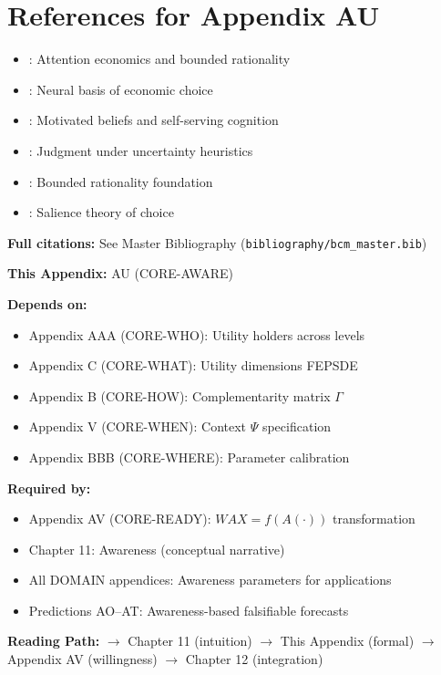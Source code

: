 \section{References for Appendix AU}
\label{sec:au-references}

\begin{itemize}[nosep]
    \item \citet{kahneman2003}: Attention economics and bounded rationality
    \item \citet{rangel2008}: Neural basis of economic choice
    \item \citet{fehrrangel2011}: Motivated beliefs and self-serving cognition
    \item \citet{tversky1974}: Judgment under uncertainty heuristics
    \item \citet{simon1955}: Bounded rationality foundation
    \item \citet{bordalo2012}: Salience theory of choice
\end{itemize}

\textbf{Full citations:} See Master Bibliography (\texttt{bibliography/bcm\_master.bib})


\begin{tcolorbox}[colback=gray!10!white, colframe=gray!75!black,
    title=\textbf{Cross-Reference Footer}]

\textbf{This Appendix:} AU (CORE-AWARE)

\textbf{Depends on:}
\begin{itemize}[nosep]
    \item Appendix AAA (CORE-WHO): Utility holders across levels
    \item Appendix C (CORE-WHAT): Utility dimensions FEPSDE
    \item Appendix B (CORE-HOW): Complementarity matrix $\Gamma$
    \item Appendix V (CORE-WHEN): Context $\Psi$ specification
    \item Appendix BBB (CORE-WHERE): Parameter calibration
\end{itemize}

\textbf{Required by:}
\begin{itemize}[nosep]
    \item Appendix AV (CORE-READY): $WAX = f(A(\cdot))$ transformation
    \item Chapter 11: Awareness (conceptual narrative)
    \item All DOMAIN appendices: Awareness parameters for applications
    \item Predictions AO--AT: Awareness-based falsifiable forecasts
\end{itemize}

\textbf{Reading Path:}
$\rightarrow$ Chapter 11 (intuition) $\rightarrow$ This Appendix (formal)
$\rightarrow$ Appendix AV (willingness) $\rightarrow$ Chapter 12 (integration)

\end{tcolorbox}

